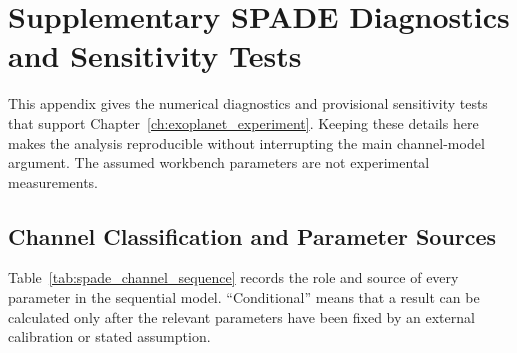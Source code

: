 \chapter{Supplementary SPADE Diagnostics and Sensitivity Tests}
\label{app:spade_diagnostics}

This appendix gives the numerical diagnostics and provisional sensitivity tests that support Chapter~\ref{ch:exoplanet_experiment}.  Keeping these details here makes the analysis reproducible without interrupting the main channel-model argument.  The assumed workbench parameters are not experimental measurements.

\section{Channel Classification and Parameter Sources}

Table~\ref{tab:spade_channel_sequence} records the role and source of every parameter in the sequential model.  ``Conditional'' means that a result can be calculated only after the relevant parameters have been fixed by an external calibration or stated assumption.

